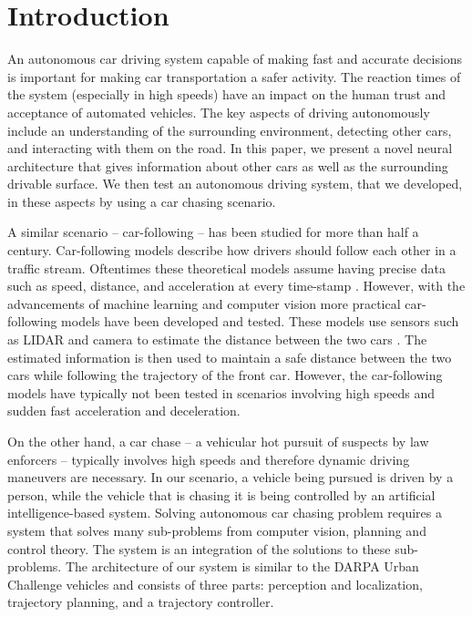 \documentclass{ctuthesis/ctuthesis}
\begin{document}
\maketitle

\chapter{Introduction}
An autonomous car driving system capable of making fast and accurate decisions is important for making car transportation a safer activity. The reaction times of the system (especially in high speeds) have an impact on the human trust and acceptance of automated vehicles. The key aspects of driving autonomously include an understanding of the surrounding environment, detecting other cars, and interacting with them on the road. In this paper, we present a novel neural architecture that gives information about other cars as well as the surrounding drivable surface. We then test an autonomous driving system, that we developed, in these aspects by using a car chasing scenario. \par


A similar scenario -- car-following -- has been studied for more than half a century. Car-following models describe how drivers should follow each other in a traffic stream. Oftentimes these theoretical models assume having precise data such as speed, distance, and acceleration at every time-stamp \cite{car_following}. However, with the advancements of machine learning and computer vision more practical car-following models have been developed and tested. These models use sensors such as LIDAR and camera to estimate the distance between the two cars \cite{lidar_highway}. The estimated information is then used to maintain a safe distance between the two cars while following the trajectory of the front car. However, the car-following models have typically not been tested in scenarios involving high speeds and sudden fast acceleration and deceleration. \par
 
 
On the other hand, a car chase -- a vehicular hot pursuit of suspects by law enforcers -- typically involves high speeds and therefore dynamic driving maneuvers are necessary. In our scenario, a vehicle being pursued is driven by a person, while the vehicle that is chasing it is being controlled by an artificial intelligence-based system. Solving autonomous car chasing problem requires a system that solves many sub-problems from computer vision, planning and control theory. The system is an integration of the solutions to these sub-problems. The architecture of our system is similar to the DARPA Urban Challenge vehicles \cite{Bertha,darpa2,darpa_book} and consists of three parts: perception and localization, trajectory planning, and a trajectory controller. \par
\end{document}
